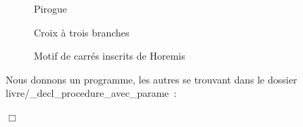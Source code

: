 \begin{figure}[!h]
%
\caption{Pirogue}%
\end{figure}
\vfil
\begin{figure}[!h]
%
\caption{Croix à trois branches}%
\label{fig:crx3b}%
\end{figure}
\onecolumn
\begin{figure}[h]
 \caption{Motif de carrés inscrits de Horemis}\label{fig:carinspt}
\end{figure}
\begin{corrige}{
Nous donnons un programme, les autres se trouvant dans le dossier 
{\idt livre/\_decl\_procedure\_avec\_parame}~:
\label{prog:HeliceEnCouleur}

\noindent $\Box$}\end{corrige}

\vfill

